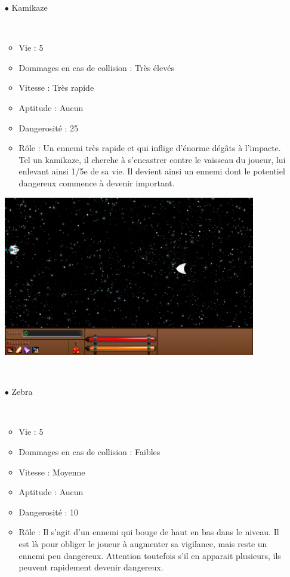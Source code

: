 \begin{itemize}
				\par~
			\item[$\bullet$ Kamikaze]
				\par~
				\begin{itemize}			
					\item Vie : 5
					\item Dommages en cas de collision : Très élevés
					\item Vitesse : Très rapide
					\item Aptitude : Aucun
					\item Dangerosité : 25%
					\item Rôle : Un ennemi très rapide et qui inflige d'énorme dégâts à l'impacte. Tel un kamikaze, il cherche à s'encastrer contre le vaisseau du joueur, lui enlevant ainsi 1/5e de sa vie. Il devient ainsi un ennemi dont le potentiel dangereux commence à devenir important.
				\end{itemize}
				\includegraphics[width=11cm]{images/vaisseaux/kamikaze.png}
				\par~
					\item[$\bullet$ Zebra]
				\par~
				\begin{itemize}
					\item Vie : 5
					\item Dommages en cas de collision : Faibles
					\item Vitesse : Moyenne
					\item Aptitude : Aucun
					\item Dangerosité : 10%
					\item Rôle : Il s'agit d'un ennemi qui bouge de haut en bas dans le niveau. Il est là pour obliger le joueur à augmenter sa vigilance, mais reste un ennemi peu dangereux. Attention toutefois s'il en apparait plusieurs, ils peuvent rapidement devenir dangereux.
				\end{itemize}

\end{itemize}

